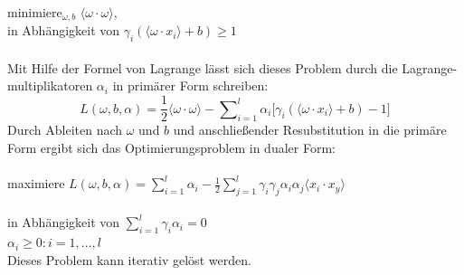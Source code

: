 \qquad minimiere$_{\omega,b}$ \hfill $\langle \omega \cdot \omega \rangle,$ \\

\qquad in Abhängigkeit von \hfill $\gamma_{i}(\langle \omega \cdot x_{i} \rangle + b) \geq 1 $ \\\\
Mit Hilfe der Formel von Lagrange lässt sich dieses Problem durch die Lagrange-multiplikatoren $\alpha_{i}$ in primärer Form schreiben:
\[ L(\omega,b,\alpha) = \frac{1}{2} \langle \omega \cdot \omega \rangle -  \sum\nolimits_{i=1}^l \alpha_{i} \lbrack \gamma_{i} (\langle \omega \cdot x_{i} \rangle + b) -1 \rbrack\]
Durch Ableiten nach $\omega$ und $b$ und anschließender Resubstitution in die primäre Form ergibt sich das Optimierungsproblem in dualer Form: \\\\

\qquad maximiere \hfill $L(\omega,b,\alpha) = \sum\nolimits_{i=1}^l \alpha_{i} - \frac{1}{2} \sum\nolimits_{j=1}^l \gamma_{i} \gamma_{j} \alpha_{i} \alpha_{j} \langle x_{i} \cdot x_{y} \rangle$ \\\\

\qquad in Abhängigkeit von \hfill $\sum\nolimits_{i=1}^l \gamma_{i} \alpha_{i} = 0$\\

\hfill $ \alpha_{i} \geq 0: i = 1,...,l$\\
Dieses Problem kann iterativ gelöst werden.\cite{laechele-svm}

